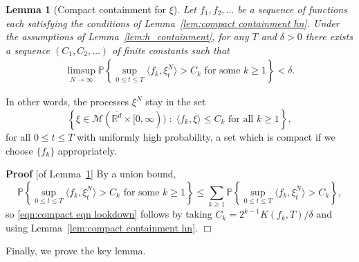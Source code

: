 \documentclass[12pt]{article}
\newenvironment {proof}{{\noindent\bf Proof }}{\hfill $\Box$ \medskip}
\newtheorem{lemma}[theorem]{Lemma}
\newcommand{\IP}{\mathbb P}
\newcommand{\IR}{\mathbb R}
\newcommand{\lp}{\xi}              %
\newcommand{\lpmeasures}{\mathcal{M}(\overline{\IR^d} \times [0,\infty))} %
\newcommand{\comment}[1]{{\color{blue} \it #1}}
\numberwithin{equation}{section}
\begin{document}
\begin{lemma}[Compact containment for $\lp$] \label{lem:compact containment lookdown}
    Let $f_1, f_2, \ldots$ be a sequence of functions each satisfying the conditions
    of Lemma~\ref{lem:compact containment hn}.
    Under the assumptions of Lemma~\ref{lem:h_containment},
    for any $T$ and $\delta > 0$ there exists a sequence
    $(C_1, C_2, \ldots)$ of finite constants such that
    \begin{align} \label{eqn:compact eqn lookdown}
    \limsup_{N \to \infty}
    \IP\left\{
        \sup_{0 \le t \le T} \langle f_k, \lp^N_t \rangle > C_k
        \text{ for some } k \ge 1
    \right\}
    < \delta .
    \end{align}
\end{lemma}

In other words, the processes $\lp^N$ stay in 
the set
$$
    \left\{
        \lp \in \lpmeasures \;:\;
        \langle f_k, \lp \rangle \le C_k
        \text{ for all } k \ge 1
    \right\} ,
$$
for all $0 \le t \le T$
with uniformly high probability,
a set which is compact if we choose $\{f_k\}$ appropriately.

\begin{proof}[of Lemma~\ref{lem:compact containment lookdown}]
    By a union bound,
    $$ 
    \IP\left\{
        \sup_{0 \le t \le T} \langle f_k, \lp^N_t \rangle > C_k
        \text{ for some } k \ge 1
    \right\}
    \le
    \sum_{k \ge 1}
    \IP\left\{
        \sup_{0 \le t \le T} \langle f_k, \lp^N_t \rangle > C_k
    \right\} ,
    $$
    so \eqref{eqn:compact eqn lookdown} follows
    by taking $C_k = 2^{k-1} K(f_k, T) / \delta$ and using Lemma~\ref{lem:compact containment hn}.
\end{proof}

Finally, we prove the key lemma.
\end{document}
